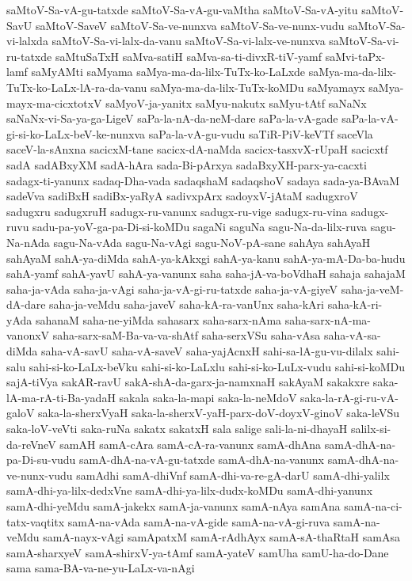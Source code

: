 {saMtoV-Sa-vA-gu-tatxde
saMtoV-Sa-vA-gu-vaMtha
saMtoV-Sa-vA-yitu
saMtoV-SavU
saMtoV-SaveV
saMtoV-Sa-ve-nunxva
saMtoV-Sa-ve-nunx-vudu
saMtoV-Sa-vi-lalxda
saMtoV-Sa-vi-lalx-da-vanu
saMtoV-Sa-vi-lalx-ve-nunxva
saMtoV-Sa-vi-ru-tatxde
saMtuSaTxH
saMva-satiH
saMva-sa-ti-divxR-tiV-yamf
saMvi-taPx-lamf
saMyAMti
saMyama
saMya-ma-da-lilx-TuTx-ko-LaLxde
saMya-ma-da-lilx-TuTx-ko-LaLx-lA-ra-da-vanu
saMya-ma-da-lilx-TuTx-koMDu
saMyamayx
saMya-mayx-ma-cicxtotxV
saMyoV-ja-yanitx
saMyu-nakutx
saMyu-tAtf
saNaNx
saNaNx-vi-Sa-ya-ga-LigeV
saPa-la-nA-da-neM-dare
saPa-la-vA-gade
saPa-la-vA-gi-si-ko-LaLx-beV-ke-nunxva
saPa-la-vA-gu-vudu
saTiR-PiV-keVTf
saceVla
saceV-la-sAnxna
sacicxM-tane
sacicx-dA-naMda
sacicx-tasxvX-rUpaH
sacicxtf
sadA
sadABxyXM
sadA-hAra
sada-Bi-pArxya
sadaBxyXH-parx-ya-cacxti
sadagx-ti-yanunx
sadaq-Dha-vada
sadaqshaM
sadaqshoV
sadaya
sada-ya-BAvaM
sadeVva
sadiBxH
sadiBx-yaRyA
sadivxpArx
sadoyxV-jAtaM
sadugxroV
sadugxru
sadugxruH
sadugx-ru-vanunx
sadugx-ru-vige
sadugx-ru-vina
sadugx-ruvu
sadu-pa-yoV-ga-pa-Di-si-koMDu
sagaNi
saguNa
sagu-Na-da-lilx-ruva
sagu-Na-nAda
sagu-Na-vAda
sagu-Na-vAgi
sagu-NoV-pA-sane
sahAya
sahAyaH
sahAyaM
sahA-ya-diMda
sahA-ya-kAkxgi
sahA-ya-kanu
sahA-ya-mA-Da-ba-hudu
sahA-yamf
sahA-yavU
sahA-ya-vanunx
saha
saha-jA-va-boVdhaH
sahaja
sahajaM
saha-ja-vAda
saha-ja-vAgi
saha-ja-vA-gi-ru-tatxde
saha-ja-vA-giyeV
saha-ja-veM-dA-dare
saha-ja-veMdu
saha-javeV
saha-kA-ra-vanUnx
saha-kAri
saha-kA-ri-yAda
sahanaM
saha-ne-yiMda
sahasarx
saha-sarx-nAma
saha-sarx-nA-ma-vanonxV
saha-sarx-saM-Ba-va-va-shAtf
saha-serxVSu
saha-vAsa
saha-vA-sa-diMda
saha-vA-savU
saha-vA-saveV
saha-yajAcnxH
sahi-sa-lA-gu-vu-dilalx
sahi-salu
sahi-si-ko-LaLx-beVku
sahi-si-ko-LaLxlu
sahi-si-ko-LuLx-vudu
sahi-si-koMDu
sajA-tiVya
sakAR-ravU
sakA-shA-da-garx-ja-namxnaH
sakAyaM
sakakxre
saka-lA-ma-rA-ti-Ba-yadaH
sakala
saka-la-mapi
saka-la-neMdoV
saka-la-rA-gi-ru-vA-galoV
saka-la-sherxVyaH
saka-la-sherxV-yaH-parx-doV-doyxV-ginoV
saka-leVSu
saka-loV-veVti
saka-ruNa
sakatx
sakatxH
sala
salige
sali-la-ni-dhayaH
salilx-si-da-reVneV
samAH
samA-cAra
samA-cA-ra-vanunx
samA-dhAna
samA-dhA-na-pa-Di-su-vudu
samA-dhA-na-vA-gu-tatxde
samA-dhA-na-vanunx
samA-dhA-na-ve-nunx-vudu
samAdhi
samA-dhiVnf
samA-dhi-va-re-gA-darU
samA-dhi-yalilx
samA-dhi-ya-lilx-dedxVne
samA-dhi-ya-lilx-dudx-koMDu
samA-dhi-yanunx
samA-dhi-yeMdu
samA-jakekx
samA-ja-vanunx
samA-nAya
samAna
samA-na-ci-tatx-vaqtitx
samA-na-vAda
samA-na-vA-gide
samA-na-vA-gi-ruva
samA-na-veMdu
samA-nayx-vAgi
samApatxM
samA-rAdhAyx
samA-sA-thaRtaH
samAsa
samA-sharxyeV
samA-shirxV-ya-tAmf
samA-yateV
samUha
samU-ha-do-Dane
sama
sama-BA-va-ne-yu-LaLx-va-nAgi
}

